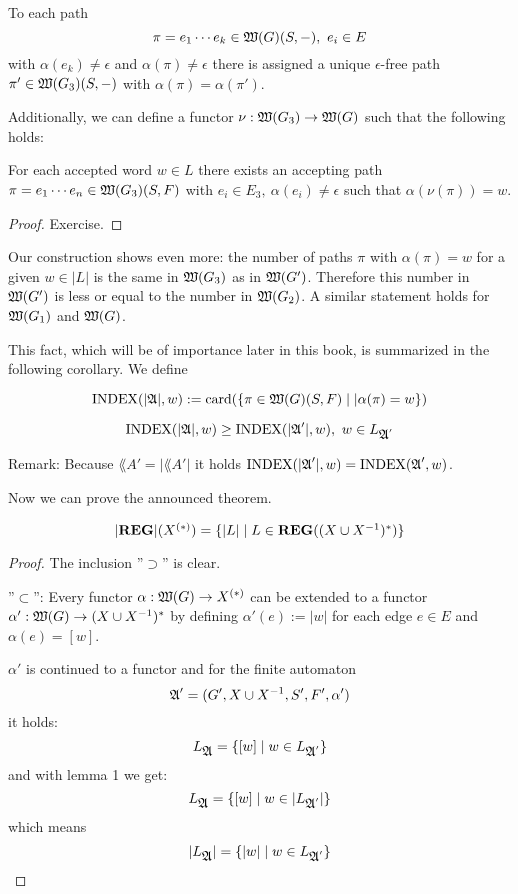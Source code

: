 \begin{corollary}
To each path
\[ \pi = e_1 \cdots e_k \in \mbox{$\mathfrak{W}(G)$}(S, -),\ e_i \in E \]
with $\alpha(e_k) \neq \epsilon$ and $\alpha(\pi) \neq \epsilon$ there is
assigned a unique $\epsilon$-free path $\pi' \in \mbox{$\mathfrak{W}(G_3)$}(S, -)$ with $\alpha(\pi) =
\alpha(\pi')$.

Additionally, we can define a functor $\nu : \mbox{$\mathfrak{W}(G_3)$} \to \mbox{$\mathfrak{W}(G)$}$ such
that the following holds:

For each accepted word $w \in L$ there exists an accepting path $\pi = e_1
\cdots e_n \in \mbox{$\mathfrak{W}(G_3)$}(S, F)$ with $e_i \in E_3,\ \alpha(e_i) \neq 
\epsilon$ such that $\alpha(\nu(\pi)) = w$.
\end{corollary}

\begin{proof}
Exercise.
\end{proof}

Our construction shows even more: the number of paths $\pi$ with $\alpha(\pi) =
w$ for a given $w \in |L|$ is the same in $\mbox{$\mathfrak{W}(G_3)$}$ as in $\mbox{$\mathfrak{W}(G')$}$.
Therefore this number in $\mbox{$\mathfrak{W}(G')$}$ is less or equal to the number in
$\mbox{$\mathfrak{W}(G_2)$}$. A similar statement holds for $\mbox{$\mathfrak{W}(G_1)$}$ and
$\mbox{$\mathfrak{W}(G)$}$.

This fact, which will be of importance later in this book, is summarized in the
following corollary. We define

\begin{definition}
\[ \mathrm{INDEX}(|\mbox{$\mathfrak{A}$}|, w) := \mathrm{card}(\mbox{$\{\pi \in \mbox{$\mathfrak{W}(G)$}(S, F) \mid
|\alpha(\pi) = w\}$}) \]
\end{definition}

\bigskip
\begin{corollary}
\[ \mathrm{INDEX}(|\mbox{$\mathfrak{A}$}|, w) \geq \mathrm{INDEX}(|\mbox{$\mathfrak{A}$}'|, w),\ w \in
L_{\mbox{$\mathfrak{A}$}'} \]
\end{corollary}

Remark: Because $\lang{A}' = |\lang{A}'|$ it holds $\mathrm{INDEX}(|\mbox{$\mathfrak{A}$}'|, w) =
\mathrm{INDEX}(\mbox{$\mathfrak{A}$}', w)$.

Now we can prove the announced theorem.

\begin{theorem}
\[ |\mbox{{\bf REG}}|(\mbox{${X}^{(*)}$}) = \mbox{$\{|L| \mid L \in \mbox{{\bf REG}}((X\cup X^{-1})^*)\}$} \]
\end{theorem}

\begin{proof}
 The inclusion ''$\supset$'' is clear.
 
 ''$\subset$'': Every functor $\alpha : \mbox{$\mathfrak{W}(G)$} \to \mbox{${X}^{(*)}$}$ can be
 extended to a functor $\alpha' : \mbox{$\mathfrak{W}(G)$} \to (X \cup {X}^{-1})^*$ by
 defining $\alpha'(e) := |w|$ for each edge $e \in E$ and $\alpha(e) = [w]$.
 
 $\alpha'$ is continued to a functor and for the finite automaton
 \[ \mbox{$\mathfrak{A}$}' = (G', X \cup {X}^{-1}, S', F', \alpha') \]
 it holds:
 \[ L_{\mbox{$\mathfrak{A}$}} = \mbox{$\{[w] \mid w \in L_{\mbox{$\mathfrak{A}$}'}\}$} \]
 and with lemma 1 we get:
 \[ L_{\mbox{$\mathfrak{A}$}} = \mbox{$\{[w] \mid w \in |L_{\mbox{$\mathfrak{A}$}'}|\}$} \]
 which means
 \[ |L_{\mbox{$\mathfrak{A}$}}| = \mbox{$\{|w| \mid w \in L_{\mbox{$\mathfrak{A}$}'}\}$} \]
\end{proof}

